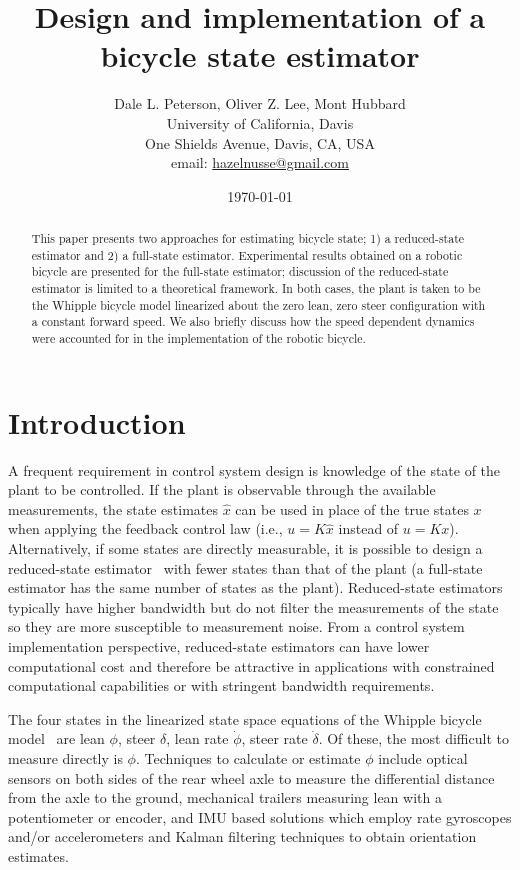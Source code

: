 \documentclass[letterpaper,11pt]{article}
\begin{document}
\title{Design and implementation of a bicycle state estimator}
\author{Dale L. Peterson, Oliver Z. Lee, Mont Hubbard\\University of
California, Davis\\One Shields Avenue, Davis, CA,
USA\\email: \href{mailto:hazelnusse@gmail.com}{hazelnusse@gmail.com}}
\date{\today}
\maketitle

\begin{abstract}
This paper presents two approaches for estimating bicycle state; 1) a
reduced-state estimator and 2) a full-state estimator. Experimental results
obtained on a robotic bicycle are presented for the full-state estimator;
discussion of the reduced-state estimator is limited to a theoretical
framework. In both cases, the plant is taken to be the Whipple bicycle model
linearized about the zero lean, zero steer configuration with a constant
forward speed.  We also briefly discuss how the speed dependent dynamics were
accounted for in the implementation of the robotic bicycle.
\end{abstract}

\section{Introduction} \label{sec:introduction}
A frequent requirement in control system design is knowledge of the state of
the plant to be controlled. If the plant is observable through the available
measurements, the state estimates $\hat{x}$ can be used in place of the true
states $x$ when applying the feedback control law (i.e., $u=K\hat{x}$ instead
of $u=Kx$). Alternatively, if some states are directly measurable, it is
possible to design a reduced-state estimator~\cite{Bryson1970} with fewer
states than that of the plant (a full-state estimator has the same number of
states as the plant).  Reduced-state estimators typically have higher bandwidth
but do not filter the measurements of the state so they are more susceptible to
measurement noise.  From a control system implementation perspective,
reduced-state estimators can have lower computational cost and therefore be
attractive in applications with constrained computational capabilities or with
stringent bandwidth requirements.

The four states in the linearized state space equations of the Whipple bicycle
model~\cite{Meijaard2007} are lean $\phi$, steer $\delta$, lean rate $\dot{\phi}$, steer rate
$\dot{\delta}$.  Of these, the most difficult to measure directly is $\phi$.
Techniques to calculate or estimate $\phi$ include optical sensors on both sides
of the rear wheel axle to measure the differential distance from the axle to the ground,
mechanical trailers measuring lean with a potentiometer or encoder, and IMU
based solutions which employ rate gyroscopes and/or accelerometers and Kalman
filtering techniques to obtain orientation estimates\cite{Boniolo2008}.
\end{document}
